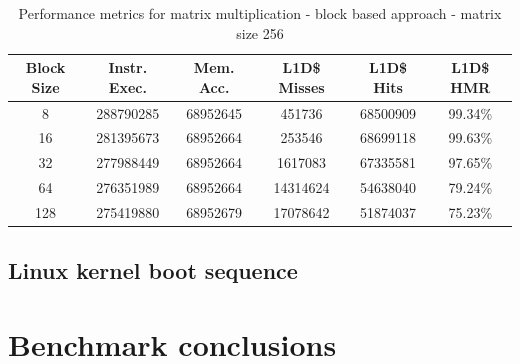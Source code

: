 \begin{center}
\begin{table}[!htbp]
\centering
\begin{tabular}{|c|c|c|c|c|c|}
\hline
\textbf{Block Size} & \textbf{Instr. Exec.} & \textbf{Mem. Acc.} & \textbf{L1D\$ Misses} & \textbf{L1D\$ Hits} & \textbf{L1D\$ HMR} \\ \hline
8 & 288790285 & 68952645 & 451736 & 68500909 & 99.34\% \\ \hline
16 & 281395673 & 68952664 & 253546 & 68699118 & 99.63\% \\ \hline
32 & 277988449 & 68952664 & 1617083 & 67335581 & 97.65\% \\ \hline
64 & 276351989 & 68952664 & 14314624 & 54638040 & 79.24\% \\ \hline
128 & 275419880 & 68952679 & 17078642 & 51874037 & 75.23\% \\ \hline
\end{tabular}
\caption{Performance metrics for matrix multiplication - block based approach - matrix size 256}
\label{tab:performance_metrics_256}
\end{table}
\end{center}

\subsection{Linux kernel boot sequence}

\section{Benchmark conclusions}
